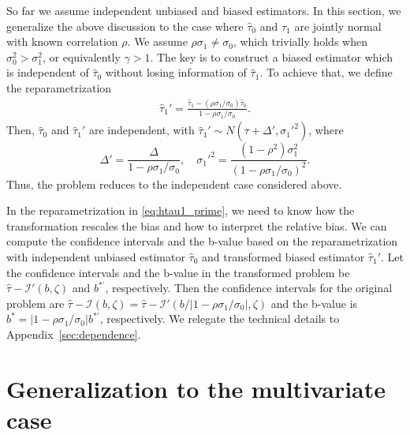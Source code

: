 \documentclass[11pt]{article}
\def\cI{{\mathcal I}}
\newcommand{\htau}{\widehat\tau}
\numberwithin{equation}{section}
\theoremstyle{definition}
\begin{document}
So far we assume independent unbiased and biased estimators. In this section, we generalize the above discussion to the case where $\htau_0$ and $\htau_1$ are jointly normal with known correlation $\rho$. We assume $\rho \sigma_1 \neq \sigma_0$, which trivially holds when $\sigma_0^2 > \sigma_1^2$, or equivalently $\gamma > 1$. The key is to construct a biased estimator which is independent of $\htau_0$ without losing information of $\htau_1$. To achieve that, we define the reparametrization
\begin{align}\label{eq:htau1_prime}
  \htau_1' = \frac{\htau_1 - (\rho \sigma_1/\sigma_0)\htau_0}{1 - \rho \sigma_1/\sigma_0}.
\end{align}
Then, $\htau_0$ and $\htau_1'$ are independent, with $\htau_1' \sim N(\tau + \Delta', \sigma_1'^2)$, where 
\[
  \Delta' = \frac{\Delta}{1 - \rho \sigma_1/\sigma_0}, \quad \sigma_1'^2 = \frac{(1-\rho^2)\sigma_1^2}{(1-\rho \sigma_1/\sigma_0)^2}.
\] 
Thus, the problem reduces to the independent case considered above.

In the reparametrization in \eqref{eq:htau1_prime}, we need to know how the transformation rescales the bias and how to interpret the relative bias. We can compute the confidence intervals and the b-value based on the reparametrization with independent unbiased estimator $\htau_0$ and transformed biased estimator $\htau_1'$. Let the confidence intervals and the b-value in the transformed problem be $\htau - \cI'(b, \zeta)$ and $b^{*’}$, respectively. Then the confidence intervals for the original problem are $\htau - \cI(b, \zeta) = \htau - \cI'(b/\lvert 1 - \rho \sigma_1/\sigma_0 \rvert, \zeta)$ and the b-value is $b^* = \lvert 1 - \rho \sigma_1/\sigma_0 \rvert b^{*'}$, respectively. We relegate the technical details to Appendix~\ref{sec:dependence}.



\section{Generalization to the multivariate case}\label{sec:multivariate}
\end{document}
